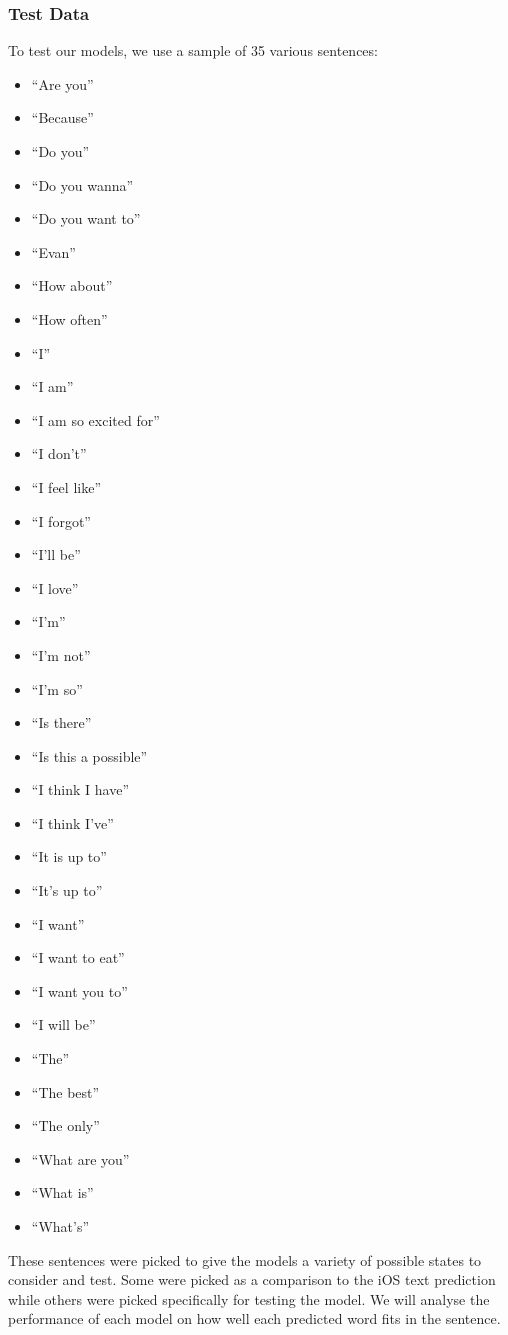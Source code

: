 \documentclass{article}
\begin{document}
\subsubsection{Test Data}
To test our models, we use a sample of 35 various sentences:
\begin{itemize}
    \setlength\itemsep{-0.5ex}
    \item ``Are you''
    \item ``Because''
    \item ``Do you''
    \item ``Do you wanna''
    \item ``Do you want to''
    \item ``Evan''
    \item ``How about''
    \item ``How often''
    \item ``I''
    \item ``I am''
    \item ``I am so excited for''
    \item ``I don't''
    \item ``I feel like''
    \item ``I forgot''
    \item ``I'll be''
    \item ``I love''
    \item ``I'm''
    \item ``I'm not''
    \item ``I'm so''
    \item ``Is there''
    \item ``Is this a possible''
    \item ``I think I have''
    \item ``I think I've''
    \item ``It is up to''
    \item ``It's up to''
    \item ``I want''
    \item ``I want to eat''
    \item ``I want you to''
    \item ``I will be''
    \item ``The''
    \item ``The best''
    \item ``The only''
    \item ``What are you''
    \item ``What is''
    \item ``What's''
\end{itemize}
These sentences were picked to give the models a variety of possible states
to consider and test. Some were picked as a comparison to the iOS text
prediction while others were picked specifically for testing the model.
We will analyse the performance of each model on how well each predicted word
fits in the sentence.
\end{document}
